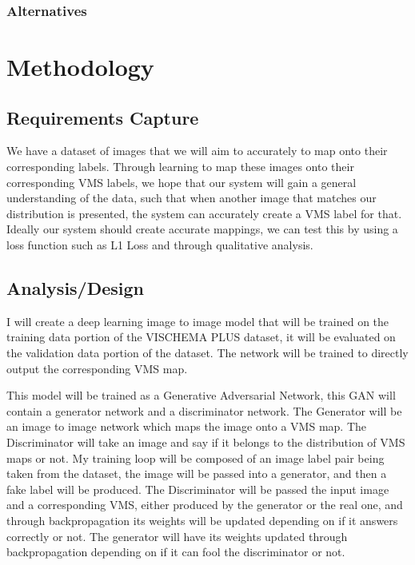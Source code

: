 \documentclass{UoYCSproject}
\begin{document}
\subsection{Alternatives}

\newpage{}

\chapter{Methodology}




\section{Requirements Capture}

We have a dataset of images that we will aim to accurately to map onto their corresponding labels. Through learning to map these images onto their corresponding VMS labels, we hope that our system will gain a general understanding of the data, such that when another image that matches our distribution is presented, the system can accurately create a VMS label for that. Ideally our system should create accurate mappings, we can test this by using a loss function such as L1 Loss and through qualitative analysis. 

\section{Analysis/Design}


I will create a deep learning image to image model that will be trained on the training data portion of the VISCHEMA PLUS dataset, it will be evaluated on the validation data portion of the dataset. The network will be trained to directly output the corresponding VMS map.

This model will be trained as a Generative Adversarial Network, this GAN will contain a generator network and a discriminator network. The Generator will be an image to image network which maps the image onto a VMS map. The Discriminator will take an image and say if it belongs to the distribution of VMS maps or not. My training loop will be composed of an image label pair being taken from the dataset, the image will be passed into a generator, and then a fake label will be produced. The Discriminator will be passed the input image and a corresponding VMS, either produced by the generator or the real one, and through backpropagation its weights will be updated depending on if it answers correctly or not. The generator will have its weights updated through backpropagation depending on if it can fool the discriminator or not. 
\end{document}
